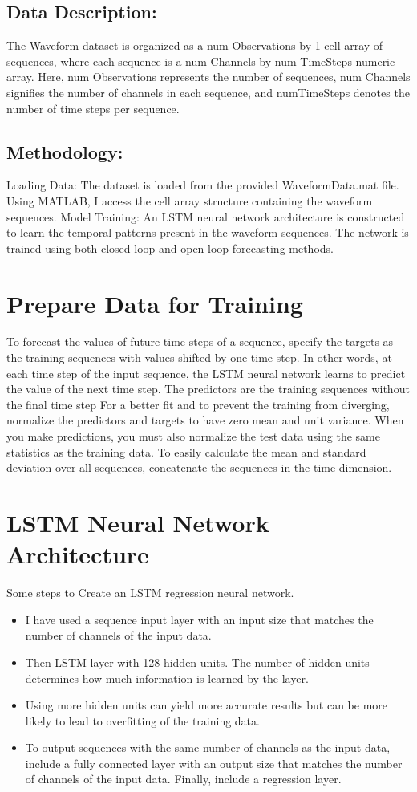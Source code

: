 \documentclass{article}
\begin{document}
\subsection{Data Description:}
The Waveform dataset is organized as a num Observations-by-1 cell array of sequences, where each sequence is a num Channels-by-num TimeSteps numeric array. Here, num Observations represents the number of sequences, num Channels signifies the number of channels in each sequence, and numTimeSteps denotes the number of time steps per sequence.

\subsection{Methodology:}

Loading Data: The dataset is loaded from the provided WaveformData.mat file. Using MATLAB, I access the cell array structure containing the waveform sequences.
Model Training: An LSTM neural network architecture is constructed to learn the temporal patterns present in the waveform sequences. The network is trained using both closed-loop and open-loop forecasting methods.
\section{Prepare Data for Training}

To forecast the values of future time steps of a sequence, specify the targets as the training sequences with values shifted by one-time step. In other words, at each time step of the input sequence, the LSTM neural network learns to predict the value of the next time step. The predictors are the training sequences without the final time step
For a better fit and to prevent the training from diverging, normalize the predictors and targets to have zero mean and unit variance. When you make predictions, you must also normalize the test data using the same statistics as the training data. To easily calculate the mean and standard deviation over all sequences, concatenate the sequences in the time dimension.

\section{LSTM Neural Network Architecture}
Some steps to Create an LSTM regression neural network.
\begin{itemize}
    \item I have used a sequence input layer with an input size that matches the number of channels of the input data.
\item Then LSTM layer with 128 hidden units. The number of hidden units determines how much information is learned by the layer.
\item Using more hidden units can yield more accurate results but can be more likely to lead to overfitting of the training data.
\item To output sequences with the same number of channels as the input data, include a fully connected layer with an output size that matches the number of channels of the input data.
Finally, include a regression layer.
\end{itemize}
\end{document}
